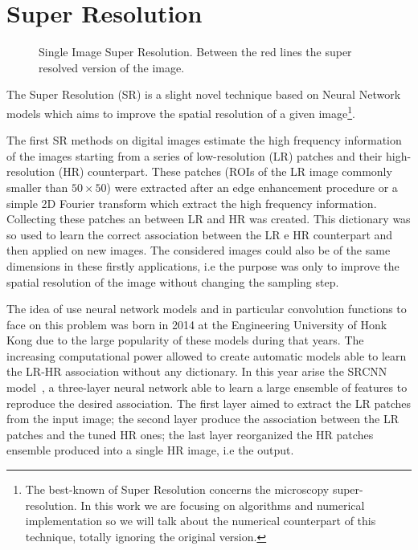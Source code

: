 \documentclass{standalone}
\begin{document}
\section[Super Resolution]{Super Resolution}\label{SR:sr}

\begin{figure}[htbp]
\def\svgwidth{0.5\textwidth}

\quad
\def\svgwidth{0.5\textwidth}

\caption{Single Image Super Resolution.
Between the red lines the super resolved version of the image.
}
\label{fig:sr_wow}
\end{figure}

The Super Resolution (SR) is a slight novel technique based on Neural Network models which aims to improve the spatial resolution of a given image\footnote{
  The best-known  of Super Resolution concerns the microscopy super-resolution.
  In this work we are focusing on algorithms and numerical implementation so we will talk about the numerical counterpart of this technique, totally ignoring the original  version.
}.

The first SR methods on digital images estimate the high frequency information of the images starting from a series of low-resolution (LR) patches and their high-resolution (HR) counterpart.
These patches (ROIs of the LR image commonly smaller than $50\times50$) were extracted after an edge enhancement procedure or a simple 2D Fourier transform which extract the high frequency information.
Collecting these patches an  between LR and HR was created.
This dictionary was so used to learn the correct association between the LR e HR counterpart and then applied on new images.
The considered images could also be of the same dimensions in these firstly applications, i.e the purpose was only to improve the spatial resolution of the image without changing the sampling step.

The idea of use neural network models and in particular convolution functions to face on this problem was born in 2014 at the Engineering University of Honk Kong due to the large popularity of these models during that years.
The increasing computational power allowed to create automatic models able to learn the LR-HR association without any dictionary.
In this year arise the SRCNN model~\cite{SRCNN}, a three-layer neural network able to learn a large ensemble of features to reproduce the desired association.
The first layer aimed to extract the LR patches from the input image; the second layer produce the association between the LR patches and the tuned HR ones; the last layer reorganized the HR patches ensemble produced into a single HR image, i.e the output.
\end{document}
